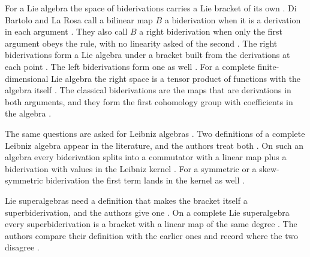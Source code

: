 For a Lie algebra the space of biderivations carries a Lie bracket of its own
\cite[p.~1]{DiBartoloLaRosa2026}. Di Bartolo and La Rosa call a bilinear
map $B$ a biderivation when it is a derivation in each argument
\cite[Definition~2.1, p.~2]{DiBartoloLaRosa2026}. They also call $B$ a
right biderivation when only the first argument obeys the rule, with no
linearity asked of the second \cite[Definition~3.1, p.~3]{DiBartoloLaRosa2026}.
The right biderivations form a Lie algebra under a bracket built from the
derivations at each point \cite[Theorem~3.5, p.~4]{DiBartoloLaRosa2026}.
The left biderivations form one as well
\cite[Theorem~3.6, p.~4]{DiBartoloLaRosa2026}. For a complete
finite-dimensional Lie algebra the right space is a tensor product of functions
with the algebra itself \cite[Corollary~3.8, p.~5]{DiBartoloLaRosa2026}.
The classical biderivations are the maps that are derivations in both
arguments, and they form the first cohomology group with coefficients in the
algebra \cite[p.~1]{DiBartoloLaRosa2026}.

The same questions are asked for Leibniz algebras
\cite[p.~1]{DiBartoloDiFattaLaRosa2025Leibniz}. Two definitions of a complete
Leibniz algebra appear in the literature, and the authors treat both
\cite[Definitions~2.6 and~2.7, p.~6]{DiBartoloDiFattaLaRosa2025Leibniz}. On such
an algebra every biderivation splits into a commutator with a linear map plus a
biderivation with values in the Leibniz kernel
\cite[Theorem~3.1, p.~7]{DiBartoloDiFattaLaRosa2025Leibniz}. For a symmetric or
a skew-symmetric biderivation the first term lands in the kernel as well
\cite[Proposition~4.1, p.~10]{DiBartoloDiFattaLaRosa2025Leibniz}.

Lie superalgebras need a definition that makes the bracket itself a
superbiderivation, and the authors give one
\cite[Definition~2.6, p.~5]{DiBartoloDiFattaLaRosa2025Super}. On a complete Lie
superalgebra every superbiderivation is a bracket with a linear map of the same
degree \cite[Theorem~3.6, p.~10]{DiBartoloDiFattaLaRosa2025Super}. The authors
compare their definition with the earlier ones and record where the two
disagree \cite[pp.~1--2]{DiBartoloDiFattaLaRosa2025Super}.

